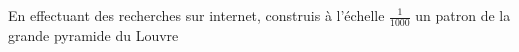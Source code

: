 
En effectuant des recherches sur internet, construis à l'échelle $\frac{1}{1000}$ un patron de la grande pyramide du Louvre

